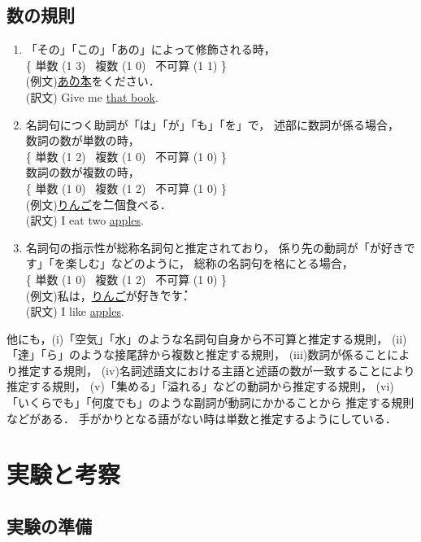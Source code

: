 \subsection{数の規則}\label{subsec:num_rule}
\begin{enumerate}
\item 「その」「この」「あの」によって修飾される時，\\
\{
\mbox{単数}  (1  3) \,
\mbox{複数}    (1  0) \,
\mbox{不可算}  (1  1)
\}\\
(例文)\underline{\.あ\.の本}をください．\\
(訳文) Give me \underline{that book}.
\item 
  名詞句につく助詞が「は」「が」「も」「を」で，
  述部に数詞が係る場合，\\
数詞の数が単数の時，\\
\{
\mbox{単数}  (1  2) \,
\mbox{複数}    (1 0) \,
\mbox{不可算}  (1  0)
\} \\
数詞の数が複数の時，\\
\{
\mbox{単数}  (1  0) \,
\mbox{複数}    (1  2) \,
\mbox{不可算}  (1  0)
\} \\
(例文)\underline{りんご}\.を\.二\.個食べる．\\
(訳文) I eat two \underline{apples}.
\item
  名詞句の指示性が総称名詞句と推定されており，
  係り先の動詞が「が好きです」「を楽しむ」などのように，
  総称の名詞句を格にとる場合，\\
\{
\mbox{単数}  (1  0) \,
\mbox{複数}    (1  2) \,
\mbox{不可算}  (1  0)
\}\\
(例文)私は，\underline{りんご}\.が\.好\.き\.で\.す．\\
(訳文) I like \underline{apples}.
\end{enumerate}

他にも，(i)「空気」「水」のような名詞句自身から不可算と推定する規則，
(ii)「達」「ら」のような接尾辞から複数と推定する規則，
(iii)数詞が係ることにより推定する規則，
(iv)名詞述語文における主語と述語の数が一致することにより推定する規則，
(v)「集める」「溢れる」などの動詞から推定する規則，
(vi)「いくらでも」「何度でも」のような副詞が動詞にかかることから
推定する規則などがある．
手がかりとなる語がない時は単数と推定するようにしている．

\section{実験と考察}\label{sec:jikken}


\subsection{実験の準備}
\label{sec:junbi}

